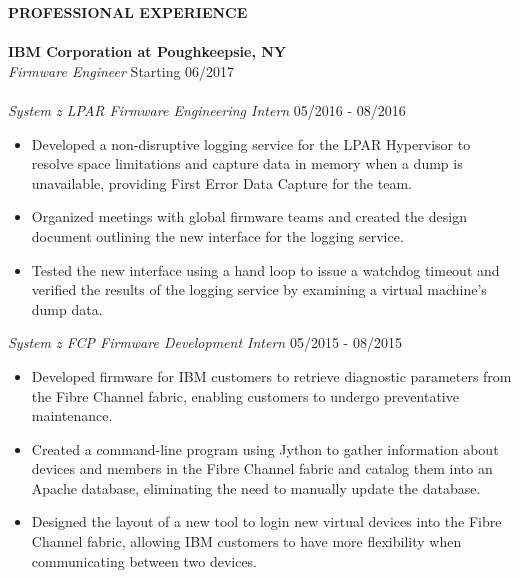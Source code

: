 \documentclass[10.5pt]{res}
\newcommand{\sectionSpace}{\vspace{-3.5pt}}
\newcommand{\itemSpace}{\vspace{-8pt}}
\begin{document}
\begin{resume}
\textbf{PROFESSIONAL EXPERIENCE} \\ [-10.5pt]
\makebox[\linewidth]{\rule{\textwidth}{0.4pt}}\\
\textbf{IBM Corporation at Poughkeepsie, NY} \\
{\it Firmware Engineer} \hfill Starting 06/2017 \\
{\vspace{-11pt}} \\
{\it System z LPAR Firmware Engineering Intern} \hfill 05/2016 - 08/2016 \\ [-11pt]  
	\begin{itemize} \itemsep -1pt %
	\item  Developed a non-disruptive logging service for the LPAR Hypervisor to resolve space limitations and capture data in memory when a dump is unavailable, providing First Error Data Capture for the team.  
 	\item Organized meetings with global firmware teams and created the design document outlining the new interface for the logging service.         
	\item Tested the new interface using a hand loop to issue a watchdog timeout and verified the results of the logging service by examining a virtual machine’s dump data.
	\end{itemize}
	\itemSpace
{\it System z FCP Firmware Development Intern} \hfill 05/2015 - 08/2015 \\ [-11pt]  
	\begin{itemize} \itemsep -1pt %
	\item Developed firmware for IBM customers to retrieve diagnostic parameters from the Fibre Channel fabric, enabling customers to undergo preventative maintenance. 
 	\item Created a command-line program using Jython to gather information about devices and members in the Fibre Channel fabric and catalog them into an Apache database, eliminating the need to manually update the database.
	\item Designed the layout of a new tool to login new virtual devices into the Fibre Channel fabric, allowing IBM customers to have more flexibility when communicating between two devices.
	\end{itemize}
	\sectionSpace


\end{resume}
\end{document}
